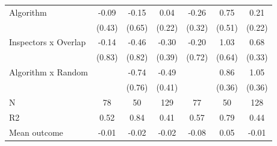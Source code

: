 \begin{tabular}{lccc|ccc}
Algorithm   &       -0.09         &       -0.15         &        0.04         &       -0.26         &        0.75         &        0.21         \\
            &      (0.43)         &      (0.65)         &      (0.22)         &      (0.32)         &      (0.51)         &      (0.22)         \\
\addlinespace
Inspectors x Overlap&       -0.14         &       -0.46         &       -0.30         &       -0.20         &        1.03         &        0.68\sym{**} \\
            &      (0.83)         &      (0.82)         &      (0.39)         &      (0.72)         &      (0.64)         &      (0.33)         \\
\addlinespace
Algorithm x Random&                     &       -0.74         &       -0.49         &                     &        0.86\sym{**} &        1.05\sym{***}\\
            &                     &      (0.76)         &      (0.41)         &                     &      (0.36)         &      (0.36)         \\
\midrule
N           &          78         &          50         &         129         &          77         &          50         &         128         \\
R2          &        0.52         &        0.84         &        0.41         &        0.57         &        0.79         &        0.44         \\
Mean outcome&       -0.01         &       -0.02         &       -0.02         &       -0.08         &        0.05         &       -0.01         \\
\bottomrule \end{tabular}
